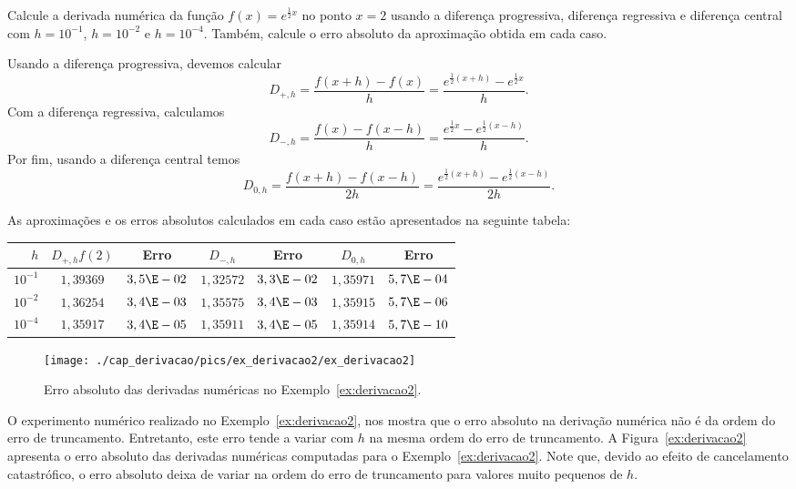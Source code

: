 \begin{ex}\label{ex:derivacao2}
Calcule a derivada numérica da função $f(x)=e^{\frac{1}{2}x}$ no ponto $x=2$ usando a diferença progressiva, diferença regressiva e diferença central com $h=10^{-1}$, $h=10^{-2}$ e $h=10^{-4}$. Também, calcule o erro absoluto da aproximação obtida em cada caso.
\end{ex}
\begin{sol}
  Usando a diferença progressiva, devemos calcular
  \begin{equation}
    D_{+,h} = \frac{f(x+h) - f(x)}{h} = \frac{e^{\frac{1}{2}(x+h)} - e^{\frac{1}{2}x}}{h}.
  \end{equation}
  Com a diferença regressiva, calculamos
  \begin{equation}
    D_{-,h} = \frac{f(x) - f(x-h)}{h} = \frac{e^{\frac{1}{2}x} - e^{\frac{1}{2}(x-h)}}{h}.
  \end{equation}
  Por fim, usando a diferença central temos
  \begin{equation}
    D_{0,h} = \frac{f(x+h) - f(x-h)}{2h} = \frac{e^{\frac{1}{2}(x+h)} - e^{\frac{1}{2}(x-h)}}{2h}.
  \end{equation}

  As aproximações e os erros absolutos calculados em cada caso estão apresentados na seguinte tabela:
  \begin{center}
    \begin{tabular}{r|cc|cc|cc}
      $h$  & $D_{+,h}f(2)$ & Erro & $D_{-,h}$ & Erro & $D_{0,h}$ & Erro \\\hline
      $10^{-1}$ & $1,39369$ & $3,5\E-02$   & $1,32572$ & $3,3\E-02$ & $1,35971$ & $5,7\E-04$\\
      $10^{-2}$ & $1,36254$ & $3,4\E-03$   & $1,35575$ & $3,4\E-03$ & $1,35915$ & $5,7\E-06$\\
      $10^{-4}$ & $1,35917$ & $3,4\E-05$   & $1,35911$ & $3,4\E-05$ & $1,35914$ & $5,7\E-10$\\\hline
    \end{tabular}
  \end{center}
\end{sol}

\begin{figure}
  \centering
  \texttt{[image: ./cap\_derivacao/pics/ex\_derivacao2/ex\_derivacao2]}
  \caption{Erro absoluto das derivadas numéricas no Exemplo~\ref{ex:derivacao2}.}
  \label{fig:ex_derivacao2}
\end{figure}


\begin{obs}
  O experimento numérico realizado no Exemplo~\ref{ex:derivacao2}, nos mostra que o erro absoluto na derivação numérica não é da ordem do erro de truncamento. Entretanto, este erro tende a variar com $h$ na mesma ordem do erro de truncamento. A Figura~\ref{ex:derivacao2} apresenta o erro absoluto das derivadas numéricas computadas para o Exemplo~\ref{ex:derivacao2}. Note que, devido ao efeito de cancelamento catastrófico, o erro absoluto deixa de variar na ordem do erro de truncamento para valores muito pequenos de $h$.
\end{obs}

